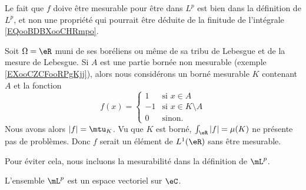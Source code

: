 \begin{normaltext}
	Le fait que \( f\) doive être mesurable pour être dans \( L^p\) est bien dans la définition de \( L^p\), et non une propriété qui pourrait être déduite de la finitude de l'intégrale \eqref{EQooBDBXooCHRmpo}.

	Soit \( \Omega=\eR\) muni de ses boréliens ou même de sa tribu de Lebesgue et de la mesure de Lebesgue. Si \( A\) est une partie bornée non mesurable (exemple \ref{EXooCZCFooRPgKjj}), alors nous considérons un borné mesurable \( K\) contenant \( A\) et la fonction
	\begin{equation}
		f(x)=\begin{cases}
			1  & \text{si } x\in A            \\
			-1 & \text{si } x\in K\setminus A \\
			0  & \text{sinon. }
		\end{cases}
	\end{equation}
	Nous avons alors \( | f |=\mtu_K\). Vu que \( K\) est borné, \( \int_{\eR}| f |=\mu(K)\) ne présente pas de problèmes. Donc \( f\) serait un élément de \( L^1(\eR)\) sans être mesurable.

	Pour éviter cela, nous incluons la mesurabilité dans la définition de \( \mL^p\).
\end{normaltext}

\begin{lemma}       \label{LEMooHVZGooRwHXMk}
	L'ensemble \( \mL^p\) est un espace vectoriel sur \( \eC\).
\end{lemma}

